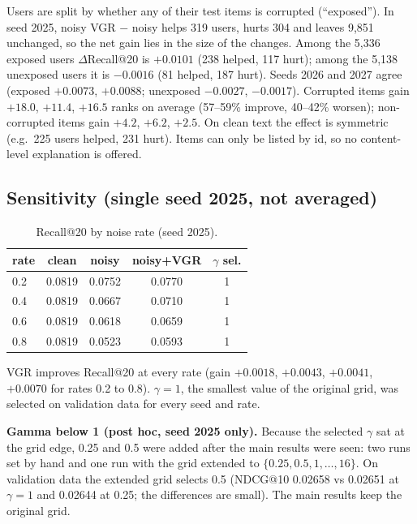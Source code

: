 \documentclass[conference]{IEEEtran}
\begin{document}
Users are split by whether any of their test items is corrupted (``exposed''). In seed 2025, noisy VGR $-$ noisy helps 319 users, hurts 304 and leaves 9,851 unchanged, so the net gain lies in the size of the changes. Among the 5,336 exposed users $\Delta$Recall@20 is $+0.0101$ (238 helped, 117 hurt); among the 5,138 unexposed users it is $-0.0016$ (81 helped, 187 hurt). Seeds 2026 and 2027 agree (exposed $+0.0073$, $+0.0088$; unexposed $-0.0027$, $-0.0017$). Corrupted items gain $+18.0$, $+11.4$, $+16.5$ ranks on average (57--59\% improve, 40--42\% worsen); non-corrupted items gain $+4.2$, $+6.2$, $+2.5$. On clean text the effect is symmetric (e.g.\ 225 users helped, 231 hurt). Items can only be listed by id, so no content-level explanation is offered.

\subsection{Sensitivity (single seed 2025, not averaged)}

\begin{table}[!t]
\centering\footnotesize
\caption{Recall@20 by noise rate (seed 2025).}
\label{tab:rate}
\begin{tabular}{@{}lcccc@{}}
\toprule
rate & clean & noisy & noisy+VGR & $\gamma$ sel. \\
\midrule
0.2 & 0.0819 & 0.0752 & 0.0770 & 1 \\
0.4 & 0.0819 & 0.0667 & 0.0710 & 1 \\
0.6 & 0.0819 & 0.0618 & 0.0659 & 1 \\
0.8 & 0.0819 & 0.0523 & 0.0593 & 1 \\
\bottomrule
\end{tabular}
\end{table}

VGR improves Recall@20 at every rate (gain $+0.0018$, $+0.0043$, $+0.0041$, $+0.0070$ for rates 0.2 to 0.8). $\gamma = 1$, the smallest value of the original grid, was selected on validation data for every seed and rate.

\textbf{Gamma below 1 (post hoc, seed 2025 only).} Because the selected $\gamma$ sat at the grid edge, 0.25 and 0.5 were added after the main results were seen: two runs set by hand and one run with the grid extended to $\{0.25, 0.5, 1,\dots,16\}$. On validation data the extended grid selects 0.5 (NDCG@10 0.02658 vs 0.02651 at $\gamma=1$ and 0.02644 at 0.25; the differences are small). The main results keep the original grid.
\end{document}

